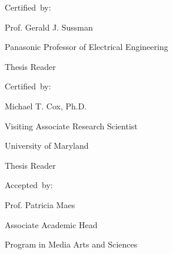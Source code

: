 \begin{flushright}
  \vspace{10mm}

  Certified~by:\hspace{0.5cm}~\makebox[2.75in]{\hrulefill}
  
                                 Prof. Gerald J. Sussman

                                 Panasonic Professor of Electrical Engineering
                                 
                                 Thesis Reader

  \vspace{10mm}

  Certified~by:\hspace{0.5cm}~\makebox[2.75in]{\hrulefill}

                                 Michael T. Cox, Ph.D.

                                 Visiting Associate Research Scientist
                                 
                                 University of Maryland

                                 Thesis Reader

  \vspace{10mm}

  Accepted~by:\hspace{0.5cm}~\makebox[2.75in]{\hrulefill}

                                 Prof. Patricia Maes

                                 Associate Academic Head

                                 Program in Media Arts and Sciences
                                 
\end{flushright}


